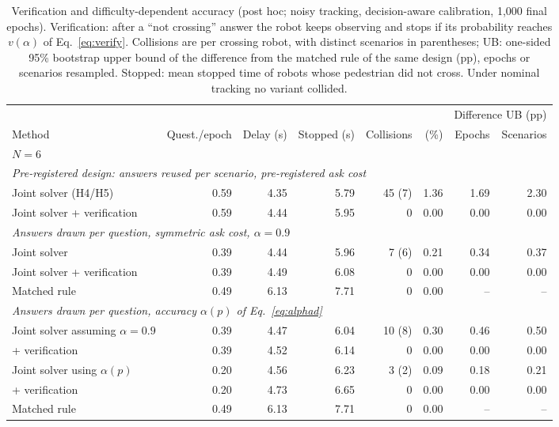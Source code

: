 \documentclass[a4paper,fleqn]{cas-dc}
\begin{document}
\begin{table}
\centering
\caption{Verification and difficulty-dependent accuracy (post hoc; noisy tracking, decision-aware calibration, 1{,}000 final epochs). Verification: after a ``not crossing'' answer the robot keeps observing and stops if its probability reaches $v(\alpha)$ of Eq.~\eqref{eq:verify}. Collisions are per crossing robot, with distinct scenarios in parentheses; UB: one-sided 95\% bootstrap upper bound of the difference from the matched rule of the same design (pp), epochs or scenarios resampled. Stopped: mean stopped time of robots whose pedestrian did not cross. Under nominal tracking no variant collided.}
\label{tab:verify}
\begin{tabular*}{\textwidth}{@{\extracolsep{\fill}}lrrrrrrr}
\toprule
 & & & & & & \multicolumn{2}{c}{Difference UB (pp)} \\
\cmidrule(lr){7-8}
Method & Quest./epoch & Delay (s) & Stopped (s) & Collisions & (\%) & Epochs & Scenarios \\
\midrule
\multicolumn{8}{l}{$N = 6$} \\
\multicolumn{8}{l}{\emph{Pre-registered design: answers reused per scenario, pre-registered ask cost}} \\
Joint solver (H4/H5) & 0.59 & 4.35 & 5.79 & 45 (7) & 1.36 & 1.69 & 2.30 \\
Joint solver + verification & 0.59 & 4.44 & 5.95 & 0 & 0.00 & 0.00 & 0.00 \\
\multicolumn{8}{l}{\emph{Answers drawn per question, symmetric ask cost, $\alpha = 0.9$}} \\
Joint solver & 0.39 & 4.44 & 5.96 & 7 (6) & 0.21 & 0.34 & 0.37 \\
Joint solver + verification & 0.39 & 4.49 & 6.08 & 0 & 0.00 & 0.00 & 0.00 \\
Matched rule & 0.49 & 6.13 & 7.71 & 0 & 0.00 & -- & -- \\
\multicolumn{8}{l}{\emph{Answers drawn per question, accuracy $\alpha(p)$ of Eq.~\eqref{eq:alphad}}} \\
Joint solver assuming $\alpha = 0.9$ & 0.39 & 4.47 & 6.04 & 10 (8) & 0.30 & 0.46 & 0.50 \\
\quad + verification & 0.39 & 4.52 & 6.14 & 0 & 0.00 & 0.00 & 0.00 \\
Joint solver using $\alpha(p)$ & 0.20 & 4.56 & 6.23 & 3 (2) & 0.09 & 0.18 & 0.21 \\
\quad + verification & 0.20 & 4.73 & 6.65 & 0 & 0.00 & 0.00 & 0.00 \\
Matched rule & 0.49 & 6.13 & 7.71 & 0 & 0.00 & -- & -- \\

\end{tabular*}
\end{table}
\end{document}

